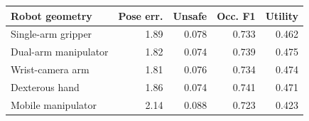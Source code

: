 \begin{tabular}{lrrrr}
\toprule
Robot geometry & Pose err. & Unsafe & Occ. F1 & Utility \\
\midrule
Single-arm gripper & 1.89 & 0.078 & 0.733 & 0.462 \\
Dual-arm manipulator & 1.82 & 0.074 & 0.739 & 0.475 \\
Wrist-camera arm & 1.81 & 0.076 & 0.734 & 0.474 \\
Dexterous hand & 1.86 & 0.074 & 0.741 & 0.471 \\
Mobile manipulator & 2.14 & 0.088 & 0.723 & 0.423 \\
\bottomrule
\end{tabular}
